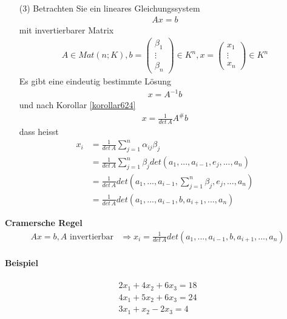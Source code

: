 \documentclass[11pt]{report}
\newcommand*\f[1] {\textbf{#1}}
\begin{document}
\begin{itemize}
\item[(3)] Betrachten Sie ein lineares Gleichungssystem 
\begin{align}
Ax = b
\end{align}
mit invertierbarer Matrix 
\begin{align}
A \in Mat(n;K), b = \begin{pmatrix} \beta_1 \\ \vdots \\ \beta_n\end{pmatrix} \in K^n, x = \begin{pmatrix} x_1 \\ \vdots \\ x_n\end{pmatrix} \in K^n
\end{align}
Es gibt eine eindeutig bestimmte Lösung
\begin{align}
x = A^{-1} b
\end{align}
und nach Korollar \ref{korollar624}
\begin{align}
x = \frac{1}{det \, A} A^{\#} b
\end{align}
dass heisst
\begin{align}
x_i &= \frac{1}{det \, A} \sum_{j=1}^{n} \alpha_{ij} \beta_j \\
&= \frac{1}{det \, A} \sum_{j=1}^{n} \beta_j det(a_1, ..., a_{i-1}, e_j, ..., a_n) \\
&=\frac{1}{det \, A} det(a_1, ..., a_{i-1}, \sum_{j=1}^{n} \beta_j, e_j, ..., a_n) \\
&=\frac{1}{det \, A} det(a_1, ..., a_{i-1}, b, a_{i+1}, ..., a_n) 
\end{align}
\end{itemize}
\f{Cramersche Regel}
\begin{align}
Ax = b, A \text{ invertierbar}
&\Rightarrow x_i = \frac{1}{det \, A} det(a_1, ..., a_{i-1}, b, a_{i+1}, ..., a_n)
\end{align}

\paragraph{Beispiel}
\begin{align}
2x_1 + 4x_2 + 6x_3 = 18 \\
4x_1 + 5x_2 + 6x_3 = 24 \\
3x_1 + x_2 - 2x_3 = 4
\end{align}
\end{document}
